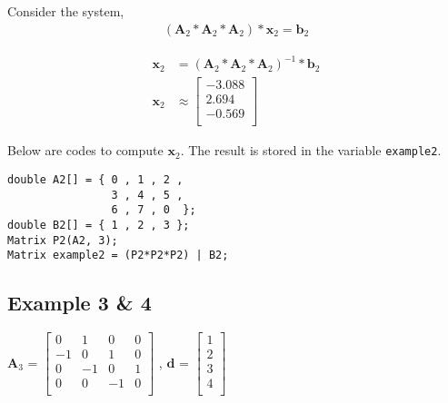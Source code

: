 \documentclass[a4paper]{article}
\begin{document}
\vspace{0.5cm}

Consider the system,
\begin{equation*}
\begin{aligned}
\left( \boldsymbol{A}_{2}*\boldsymbol{A}_{2}*\boldsymbol{A}_{2} \right)  * \boldsymbol{x}_{2}  = \boldsymbol{b}_{2}
\end{aligned}
\end{equation*}





\begin{equation*}
\begin{aligned}
\boldsymbol{x}_{2}  &= \left(\boldsymbol{A}_{2}*\boldsymbol{A}_{2}*\boldsymbol{A}_{2} \right)^{-1} * \boldsymbol{b}_{2} \\
\boldsymbol{x}_{2}  &\approx 
\begin{bmatrix} 
-3.088 \\
2.694 \\
-0.569 \\
\end{bmatrix}
\end{aligned}
\end{equation*}



Below are codes to compute $\boldsymbol{x}_{2}$. The result is stored in the variable \texttt{example2}.

\begin{verbatim}  
double A2[] = { 0 , 1 , 2 ,
                3 , 4 , 5 , 
                6 , 7 , 0  };
double B2[] = { 1 , 2 , 3 }; 
Matrix P2(A2, 3);
Matrix example2 = (P2*P2*P2) | B2;  
\end{verbatim}


 




\subsection{Example 3 \& 4} 

$\boldsymbol{A}_{3}$ = $\begin{bmatrix}
 0 &  1 &  0 & 0\\
-1 &  0 &  1 & 0\\ 
 0 & -1 &  0 & 1\\
 0 &  0 & -1 & 0\\
\end{bmatrix}$ \hspace{0.5cm} , \hspace{0.5cm} 
$\boldsymbol{d}$ = $\begin{bmatrix}
1 \\ 
2 \\
3 \\ 
4 \\ 
\end{bmatrix}$
\end{document}
